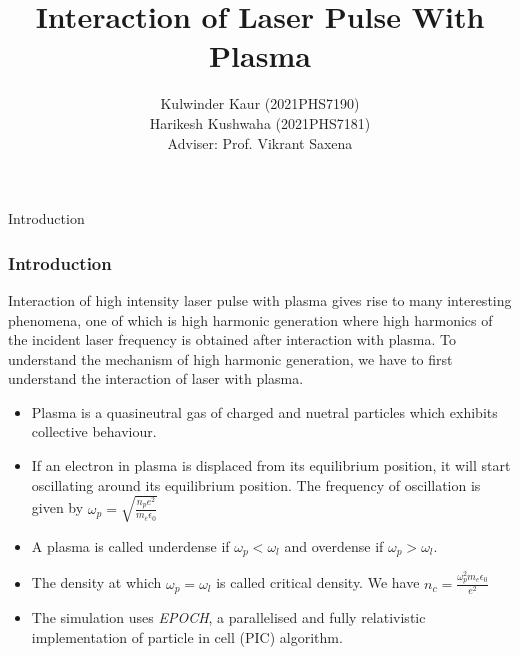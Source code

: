 \documentclass{beamer}
\title[Interaction of Laser Pulse With Plasma]{Interaction of Laser Pulse With Plasma}
\date{}
\institute[IIT Delhi]{\large Indian Institute of Technology, Delhi}
\author[]{Kulwinder Kaur (2021PHS7190)\\ Harikesh Kushwaha (2021PHS7181)\\[3mm]Adviser: Prof. Vikrant Saxena}
\begin{document}
\maketitle
\begin{frame}{Introduction}
    \frametitle{Introduction}
    \small
    Interaction of high intensity laser pulse with plasma gives rise to many interesting phenomena, one of which is high harmonic generation where high harmonics of the incident laser frequency is obtained after interaction with plasma. To understand the mechanism of high harmonic generation, we have to first understand the interaction of laser with plasma.\\
    \begin{itemize}
        \item Plasma is a quasineutral gas of charged and nuetral particles which exhibits collective behaviour.
        \item If an electron in plasma is displaced from its equilibrium position, it will start oscillating around its equilibrium position. The frequency of oscillation is given by\cite{chen} $\omega_p = \sqrt{\frac{n_pe^2}{m_e\epsilon_0}}$
        \item A plasma is called underdense if $\omega_p < \omega_l$ and overdense if $\omega_p > \omega_l$.
        \item The density at which $\omega_p = \omega_l$ is called critical density. We have $n_c = \frac{\omega_p^2m_e\epsilon_0}{e^2}$
        \item The simulation uses \textit{EPOCH}\cite{epoch}, a parallelised and fully relativistic implementation of particle in cell
              (PIC) algorithm.
    \end{itemize}
\end{frame}
\end{document}
